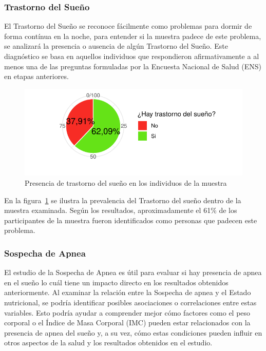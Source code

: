\documentclass[
  10pt,
  letterpaper,
  DIV=11,
  numbers=noendperiod,
  twocolumn]{scrartcl}
\begin{document}
\hypertarget{trastorno-del-sueuxf1o-1}{%
\subsubsection{Trastorno del Sueño}\label{trastorno-del-sueuxf1o-1}}

El Trastorno del Sueño se reconoce fácilmente como problemas para dormir
de forma contínua en la noche, para entender si la muestra padece de
este problema, se analizará la presencia o ausencia de algún Trastorno
del Sueño. Este diagnóstico se basa en aquellos individuos que
respondieron afirmativamente a al menos una de las preguntas formuladas
por la Encuesta Nacional de Salud (ENS) en etapas anteriores.

\begin{figure}[H]

{\centering \includegraphics{informe_estadistico_files/figure-pdf/fig-f2-1.pdf}

}

\caption{\label{fig-f2}Presencia de trastorno del sueño en los
individuos de la muestra}

\end{figure}

En la figura~\ref{fig-f2} se ilustra la prevalencia del Trastorno del
sueño dentro de la muestra examinada. Según los resultados,
aproximadamente el 61\% de los participantes de la muestra fueron
identificados como personas que padecen este problema.

\hypertarget{sospecha-de-apnea}{%
\subsubsection{Sospecha de Apnea}\label{sospecha-de-apnea}}

El estudio de la Sospecha de Apnea es útil para evaluar si hay presencia
de apnea en el sueño lo cuál tiene un impacto directo en los resultados
obtenidos anteriormente. Al examinar la relación entre la Sospecha de
apnea y el Estado nutricional, se podría identificar posibles
asociaciones o correlaciones entre estas variables. Esto podría ayudar a
comprender mejor cómo factores como el peso corporal o el Índice de Masa
Corporal (IMC) pueden estar relacionados con la presencia de apnea del
sueño y, a su vez, cómo estas condiciones pueden influir en otros
aspectos de la salud y los resultados obtenidos en el estudio.
\end{document}
